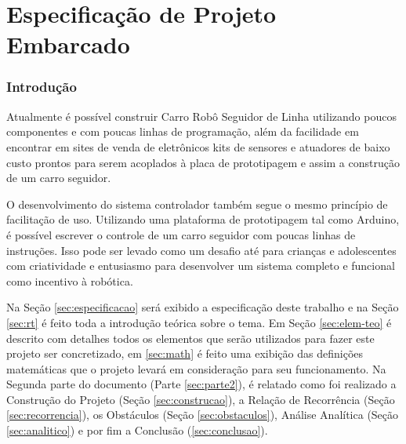 \documentclass[portugues, brazil, a4paper,12pt]{article}
\begin{document}

\part{Especificação de Projeto Embarcado}

\section{Introdução}
	Atualmente é possível construir Carro Robô Seguidor de Linha utilizando poucos componentes e com poucas linhas de programação, além da facilidade em encontrar em sites de venda de eletrônicos kits de sensores e atuadores de baixo custo prontos para serem acoplados à placa de prototipagem e assim a construção de um carro seguidor.

	O desenvolvimento do sistema controlador também segue o mesmo princípio de facilitação de uso. Utilizando uma plataforma de prototipagem tal como Arduino, é possível escrever o controle de um carro seguidor com poucas linhas de instruções. Isso pode ser levado como um desafio até para crianças e adolescentes com criatividade e entusiasmo para desenvolver um sistema completo e funcional como incentivo à robótica.

	Na Seção \ref{sec:especificacao} será exibido a especificação deste trabalho e na Seção \ref{sec:rt} é feito toda a introdução teórica sobre o tema. Em Seção \ref{sec:elem-teo} é descrito com detalhes todos os elementos que serão utilizados para fazer este projeto ser concretizado, em \ref{sec:math} é feito uma exibição das definições matemáticas que o projeto levará em consideração para seu funcionamento. Na Segunda parte do documento (Parte \ref{sec:parte2}), é relatado como foi realizado a Construção do Projeto (Seção \ref{sec:construcao}), a Relação de Recorrência (Seção \ref{sec:recorrencia}), os Obstáculos (Seção \ref{sec:obstaculos}), Análise Analítica (Seção \ref{sec:analitico}) e por fim a Conclusão (\ref{sec:conclusao}).
	
\end{document}
